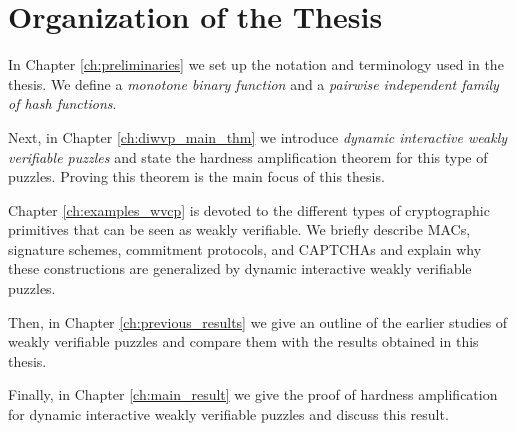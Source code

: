 \section{Organization of the Thesis}
In Chapter \ref{ch:preliminaries} we set up the notation and terminology used in the thesis.
We define a \textit{monotone binary function} and a \textit{pairwise independent family of hash functions}.

Next, in Chapter \ref{ch:diwvp_main_thm} we introduce \textit{dynamic interactive weakly verifiable
puzzles} and state the hardness amplification theorem for this type of puzzles.
Proving this theorem is the main focus of this thesis.

Chapter \ref{ch:examples_wvcp} is devoted to the different types of cryptographic primitives that
can be seen as weakly verifiable.
We briefly describe MACs, signature schemes, commitment protocols, and CAPTCHAs and explain why
these constructions are generalized by dynamic interactive weakly verifiable puzzles.

Then, in Chapter \ref{ch:previous_results} we give an outline of the earlier studies of weakly
verifiable puzzles and compare them with the results obtained in this thesis.

Finally, in Chapter \ref{ch:main_result} we give the proof of hardness amplification
for dynamic interactive weakly verifiable puzzles and discuss this result.

